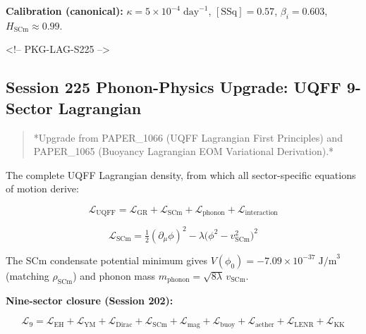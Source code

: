 \documentclass[12pt,a4paper]{article}
\begin{document}
\textbf{Calibration (canonical):} $\kappa = 5 \times 10^{-4}\;\text{day}^{-1}$, $[\text{SSq}] = 0.57$, $\beta_i = 0.603$, $H_{\text{SCm}} \approx 0.99$.

<!-- PKG-LAG-S225 -->

\subsection{Session 225 Phonon-Physics Upgrade: UQFF 9-Sector Lagrangian}

\begin{quote}
*Upgrade from PAPER\_1066 (UQFF Lagrangian First Principles) and
PAPER\_1065 (Buoyancy Lagrangian EOM Variational Derivation).*
\end{quote}

The complete UQFF Lagrangian density, from which all sector-specific equations of motion derive:

\begin{equation}
\mathcal{L}_{\text{UQFF}} = \mathcal{L}_{\text{GR}} + \mathcal{L}_{\text{SCm}} + \mathcal{L}_{\text{phonon}} + \mathcal{L}_{\text{interaction}}
\end{equation}

\begin{equation}
\mathcal{L}_{\text{SCm}} = \tfrac{1}{2}(\partial_\mu \phi)^2 - \lambda\bigl(\phi^2 - v_{\text{SCm}}^2\bigr)^2
\end{equation}

The SCm condensate potential minimum gives $V(\phi_0) = -7.09 \times 10^{-37}\;\text{J/m}^3$ (matching $\rho_{\text{SCm}}$) and phonon mass $m_{\text{phonon}} = \sqrt{8\lambda}\,v_{\text{SCm}}$.

\textbf{Nine-sector closure (Session 202):}

\begin{equation}
\mathcal{L}_{9} = \mathcal{L}_{\text{EH}} + \mathcal{L}_{\text{YM}} + \mathcal{L}_{\text{Dirac}} + \mathcal{L}_{\text{SCm}} + \mathcal{L}_{\text{mag}} + \mathcal{L}_{\text{buoy}} + \mathcal{L}_{\text{aether}} + \mathcal{L}_{\text{LENR}} + \mathcal{L}_{\text{KK}}
\end{equation}
\end{document}
